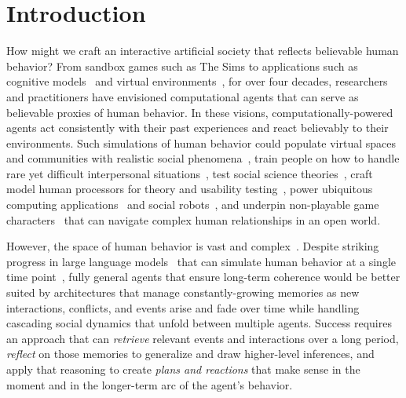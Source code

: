 \section{Introduction}
How might we craft an interactive artificial society that reflects believable human behavior? From sandbox games such as The Sims to applications such as cognitive models~\cite{card1983psychology} and virtual environments~\cite{4_laird2001human, 22_bates1994role}, for over four decades, researchers and practitioners have envisioned computational agents that can serve as believable proxies of human behavior. In these visions, computationally-powered agents act consistently with their past experiences and react believably to their environments. Such simulations of human behavior could populate virtual spaces and communities with realistic social phenomena~\cite{29_dill2011game, 9_park2022socialsimulacra}, train people on how to handle rare yet difficult interpersonal situations~\cite{10_tambe1995intelligent, 11_jones1999automated, 20_hollan1984steamer}, test social science theories~\cite{binz2023using, 63_horton2023large}, craft model human processors for theory and usability testing~\cite{card1983psychology, john1996goms, hamalainen2023evaluating}, power ubiquitous computing applications~\cite{fast2016augur} and social robots~\cite{22_bates1994role, 41_Bledsoe1986Dream}, and underpin non-playable game characters~\cite{4_laird2001human, 6_riedl2012interactive} that can navigate complex human relationships in an open world. 

However, the space of human behavior is vast and complex~\cite{6_riedl2012interactive, 25_yannakakis2012game}. Despite striking progress in large language models~\cite{59_brown2020language} that can simulate human behavior at a single time point~\cite{9_park2022socialsimulacra,hamalainen2023evaluating}, fully general agents that ensure long-term coherence would be better suited by architectures that manage constantly-growing memories as new interactions, conflicts, and events arise and fade over time while handling cascading social dynamics that unfold between multiple agents. Success requires an approach that can \textit{retrieve} relevant events and interactions over a long period, \textit{reflect} on those memories to generalize and draw higher-level inferences, and apply that reasoning to create \textit{plans and reactions} that make sense in the moment and in the longer-term arc of the agent's behavior. 

